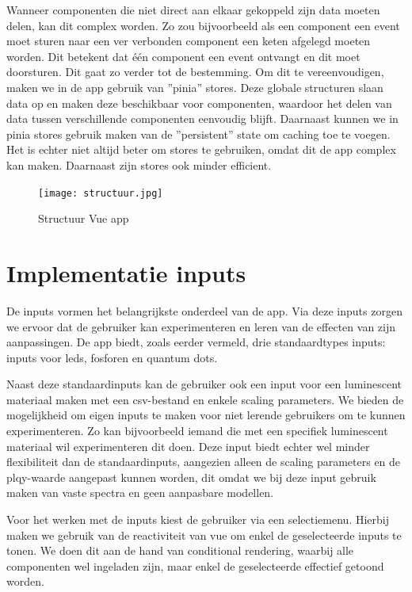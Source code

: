 Wanneer componenten die niet direct aan elkaar gekoppeld zijn data moeten delen, kan dit complex worden. Zo zou bijvoorbeeld als een component een event moet sturen naar een ver verbonden component een keten afgelegd moeten worden. Dit betekent dat \'e\'en component een event ontvangt en dit moet doorsturen. Dit gaat zo verder tot de bestemming. Om dit te vereenvoudigen, maken we in de app gebruik van ''pinia'' stores. Deze globale structuren slaan data op en maken deze beschikbaar voor componenten, waardoor het delen van data tussen verschillende componenten eenvoudig blijft. Daarnaast kunnen we in pinia stores gebruik maken van de ''persistent'' state om caching toe te voegen. Het is echter niet altijd beter om stores te gebruiken, omdat dit de app complex kan maken. Daarnaast zijn stores ook minder efficient.


\begin{figure}[H]
    \centering
    \texttt{[image: structuur.jpg]}
    \caption{Structuur Vue app}%
    \label{fig:vue_structure}
\end{figure}

\section{Implementatie inputs}

De inputs vormen het belangrijkste onderdeel van de app. Via deze inputs zorgen we ervoor dat de gebruiker kan experimenteren en leren van de effecten van zijn aanpassingen. De app biedt, zoals eerder vermeld, drie standaardtypes inputs: inputs voor \gls{led}s, fosforen en quantum dots.

Naast deze standaardinputs kan de gebruiker ook een input voor een luminescent materiaal maken met een csv-bestand en enkele scaling parameters. We bieden de mogelijkheid om eigen inputs te maken voor niet lerende gebruikers om te kunnen experimenteren. Zo kan bijvoorbeeld iemand die met een specifiek luminescent materiaal wil experimenteren dit doen. Deze input biedt echter wel minder flexibiliteit dan de standaardinputs, aangezien alleen de scaling parameters en de \gls{plqy}-waarde aangepast kunnen worden, dit omdat we bij deze input gebruik maken van vaste spectra en geen aanpasbare modellen.  

Voor het werken met de inputs kiest de gebruiker via een selectiemenu. Hierbij maken we gebruik van de reactiviteit van vue om enkel de geselecteerde inputs te tonen. We doen dit aan de hand van conditional rendering, waarbij alle componenten wel ingeladen zijn, maar enkel de geselecteerde effectief getoond worden.

